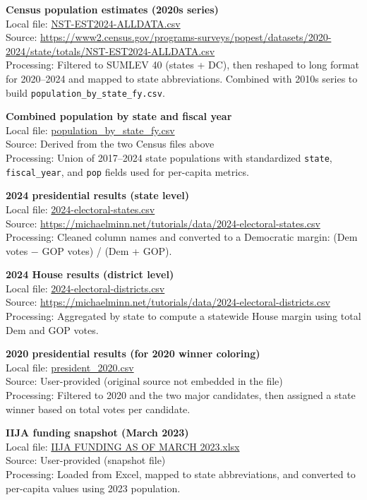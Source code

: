 \documentclass[
  11pt,
]{article}
\begin{document}
\textbf{Census population estimates (2020s series)}\\
Local file: \url{NST-EST2024-ALLDATA.csv}\\
Source:
\url{https://www2.census.gov/programs-surveys/popest/datasets/2020-2024/state/totals/NST-EST2024-ALLDATA.csv}\\
Processing: Filtered to SUMLEV 40 (states + DC), then reshaped to long
format for 2020--2024 and mapped to state abbreviations. Combined with
2010s series to build \texttt{population\_by\_state\_fy.csv}.

\textbf{Combined population by state and fiscal year}\\
Local file: \url{population_by_state_fy.csv}\\
Source: Derived from the two Census files above\\
Processing: Union of 2017--2024 state populations with standardized
\texttt{state}, \texttt{fiscal\_year}, and \texttt{pop} fields used for
per-capita metrics.

\textbf{2024 presidential results (state level)}\\
Local file: \url{2024-electoral-states.csv}\\
Source:
\url{https://michaelminn.net/tutorials/data/2024-electoral-states.csv}\\
Processing: Cleaned column names and converted to a Democratic margin:
(Dem votes − GOP votes) / (Dem + GOP).

\textbf{2024 House results (district level)}\\
Local file: \url{2024-electoral-districts.csv}\\
Source:
\url{https://michaelminn.net/tutorials/data/2024-electoral-districts.csv}\\
Processing: Aggregated by state to compute a statewide House margin
using total Dem and GOP votes.

\textbf{2020 presidential results (for 2020 winner coloring)}\\
Local file: \url{president_2020.csv}\\
Source: User-provided (original source not embedded in the file)\\
Processing: Filtered to 2020 and the two major candidates, then assigned
a state winner based on total votes per candidate.

\textbf{IIJA funding snapshot (March 2023)}\\
Local file:
\href{IIJA\%20FUNDING\%20AS\%20OF\%20MARCH\%202023.xlsx}{IIJA FUNDING AS
OF MARCH 2023.xlsx}\\
Source: User-provided (snapshot file)\\
Processing: Loaded from Excel, mapped to state abbreviations, and
converted to per-capita values using 2023 population.
\end{document}
